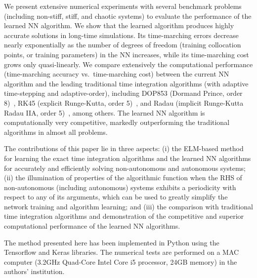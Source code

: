 We present extensive numerical experiments with several benchmark
problems (including non-stiff, stiff, and chaotic systems) to evaluate
the performance of the learned NN  algorithm.
We show that the learned algorithm produces highly accurate solutions
in long-time simulations. Its time-marching errors
decrease nearly exponentially as the number of
degrees of freedom (training collocation points, or
training parameters) in the NN  increases, while its time-marching
cost grows only quasi-linearly.
%
We compare extensively the computational performance (time-marching accuracy
vs.~time-marching cost) between the current NN algorithm
and the leading traditional time integration algorithms (with 
adaptive time-stepping and adaptive-order),
including DOP853 (Dormand Prince, order 8)~\cite{HairerNW1993},
RK45 (explicit Runge-Kutta, order 5)~\cite{DormandP1980},
and Radau (implicit Runge-Kutta Radau IIA, order 5)~\cite{HairerW1996}, among others.
The learned NN algorithm is computationally very competitive,
markedly outperforming the traditional algorithms in almost all problems.




The contributions of this paper lie in three aspects:
(i) the ELM-based method for learning the exact time integration algorithms
and the learned NN algorithms for accurately and efficiently solving
non-autonomous and autonomous systems;
(ii) the illumination of properties of the algorithmic function when the RHS
of non-autonomous (including autonomous) systems exhibits a periodicity
with respect to any of its arguments, which can be used to greatly
simplify the network training and algorithm learning; and
(iii) the comparison with traditional time integration algorithms
and  demonstration of the competitive and superior computational
performance of the learned NN algorithms. 


The method presented here has been implemented in Python
using the Tensorflow and Keras libraries. The numerical tests are performed
on a MAC computer (3.2GHz Quad-Core Intel Core i5 processor, 24GB memory)
in the authors' institution.


